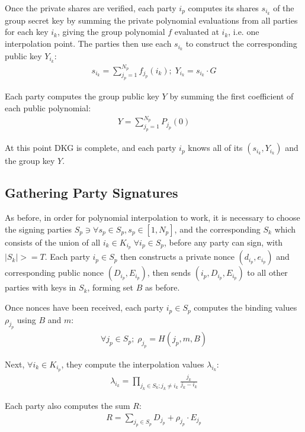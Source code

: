 \documentclass{article}
\theoremstyle{definition}
\theoremstyle{remark}
\begin{document}
Once the private shares are verified, each party $i_p$ computes its shares $s_{i_k}$ of the group secret key by summing the private polynomial evaluations from all parties for each key $i_k$, giving the group polynomial $f$ evaluated at $i_k$, i.e. one interpolation point. The parties then use each $s_{i_k}$ to construct the corresponding public key $Y_{i_k}$:
\begin{align}
  s_{i_k} = \sum_{j_p = 1}^{N_p} f_{j_p}(i_k) ;\; Y_{i_k} = s_{i_k} \cdot G
\end{align}

Each party computes the group public key $Y$ by summing the first coefficient of each public polynomial:
\begin{align}
  Y = \sum_{j_p=1}^{N_p} P_{j_p}(0)
\end{align}

At this point DKG is complete, and each party $i_p$ knows all of its $(s_{i_k}, Y_{i_k})$ and the group key $Y$.

\subsection{
  Gathering Party Signatures
}

As before, in order for polynomial interpolation to work, it is necessary to choose the signing parties $S_p \ni \forall s_p \in S_p, s_p \in [1, N_p]$, and the corresponding $S_k$ which consists of the union of all $i_k \in K_{i_p}\; \forall i_p \in S_p$, before any party can sign, with $|S_k| >= T$.  Each party $i_p \in S_p$ then constructs a private nonce $(d_{i_p},e_{i_p})$ and corresponding public nonce $(D_{i_p},E_{i_p})$, then sends $(i_p, D_{i_p},E_{i_p})$ to all other parties with keys in $S_k$, forming set $B$ as before.

Once nonces have been received, each party $i_p \in S_p$ computes the binding values $\rho_{j_p}$ using $B$ and $m$:
\begin{align}
  \forall j_p \in S_p;\;\rho_{j_p} = H(j_p, m, B)
\end{align}

Next, $\forall i_k \in K_{i_p}$,  they compute the interpolation values $\lambda_{i_k}$:
\begin{align}
  \lambda_{i_k} = \prod_{j_k \in S_k; j_k \neq i_k}^{} \frac{j_k}{j_k - i_k}
\end{align}

Each party also computes the sum $R$:
\begin{align}
  R = \sum_{j_p \in S_p}^{} D_{j_p} + \rho_{j_p} \cdot E_{j_p}
\end{align}
\end{document}
